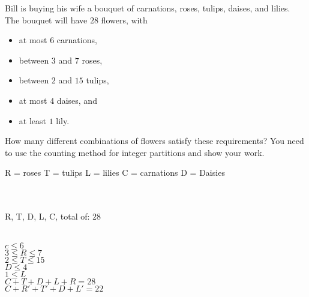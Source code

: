 \documentclass{article}
\begin{document}
\vskip 0.4in
\begin{problem}
Bill is buying his wife a bouquet of carnations, roses, tulips, daises, and lilies. 
The bouquet will have $28$ flowers, with 
%
\begin{itemize} 
		\item at most $6$ carnations, 
		\item between $3$ and $7$ roses,
        \item between $2$ and $15$ tulips,
        \item at most $4$ daises, and
    	\item at least $1$ lily.

\end{itemize}
%
How many different combinations of flowers satisfy these requirements?
You need to use the counting method for integer partitions and show your work.

\begin{solution}
\newline
R = roses
\newline
T = tulips
\newline
L = lilies
\newline
C = carnations
\newline
D = Daisies
\newline


\\\\ R, T, D, L, C, total of: 28
\newline

\\ $c \le 6$
\newline
\\ $3 \le R \le 7$ 
\newline
\\ $2 \le T \le 15$ 
\newline
\\ $D \le 4$
\newline
\\ $1 \le L$ 
\newline
\\ $C+T+D+L+R = 28$
\newline
\\ $C+R'+T'+D+L' = 22$
\newline


\end{solution}
\end{problem}
\end{document}
